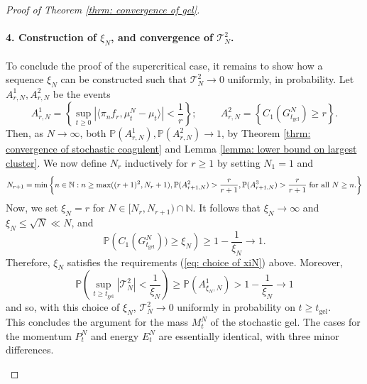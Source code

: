 \begin{proof}[Proof of Theorem \ref{thrm: convergence of gel}]
       \paragraph{4. Construction of $\xi_N$, and convergence of $\mathcal{T}^2_N$.} To conclude the proof of the supercritical case, it remains to show how a sequence $\xi_N$ can be constructed such that $\mathcal{T}^2_N \rightarrow 0$ uniformly, in probability. Let $A^1_{r,N}, A^2_{r,N}$ be the events \begin{equation} \label{eq: definition of A1rn}
       A^1_{r,N}=\left\{\sup_{t\geq 0} |\langle \pi_n f_r, \mu^N_t-\mu_t\rangle|<\frac{1}{r}\right\}; \hspace{1cm}
       A^2_{r,N}=\left\{C_1(G^N_{t_\text{gel}}) \geq r\right\}.
   \end{equation} Then, as $N\rightarrow \infty$, both $\mathbb{P}(A^1_{r,N}), \mathbb{P}(A^2_{r,N}) \rightarrow 1$, by Theorem \ref{thrm: convergence of stochastic coagulent} and Lemma \ref{lemma: lower bound on largest cluster}. We now define $N_r$ inductively for $r\geq 1$ by setting $N_1=1$ and \begin{equation}
       \label{eq: recursive definition of Nr} N_{r+1}=\min\left\{n \in \mathbb{N}: n\geq \max((r+1)^2, N_r+1),  \mathbb{P}(A^2_{r+1,N})>\frac{r}{r+1},  \mathbb{P}(A^3_{r+1,N})>\frac{r}{r+1} \hspace{0.1cm} \text{for all }N\geq n. \right\}
   \end{equation} Now, we set $\xi_N=r$ for $N\in [N_r, N_{r+1})\cap\mathbb{N}.$ It follows that $\xi_N \rightarrow \infty$ and $\xi_N\leq \sqrt{N}\ll N$, and \begin{equation}
       \mathbb{P}\left(C_1(G^N_{t_\text{gel}}))\geq \xi_N\right)\ge 1-\frac{1}{\xi_N} \rightarrow 1. 
   \end{equation} Therefore, $\xi_N$ satisfies the requirements (\ref{eq: choice of xiN}) above. Moreover, \begin{equation}
       \mathbb{P}\left(\sup_{t\geq t_\text{gel}} |\mathcal{T}^2_N| <\frac{1}{\xi_N}\right) \ge \mathbb{P}\left(A^1_{\xi_N,N}\right) > 1-\frac{1}{\xi_N}\rightarrow 1
   \end{equation} and so, with this choice of $\xi_N$, $\mathcal{T}^2_N \rightarrow 0$ uniformly in probability on $t\ge t_\text{gel}.$ \bigskip \\ This concludes the argument for the mass $M^N_t$ of the stochastic gel. The cases for the momentum $P^N_t$ and energy $E^N_t$ are essentially identical, with three minor differences. \begin{enumerate}[label=\roman{*}).]

\end{enumerate}
\end{proof}
